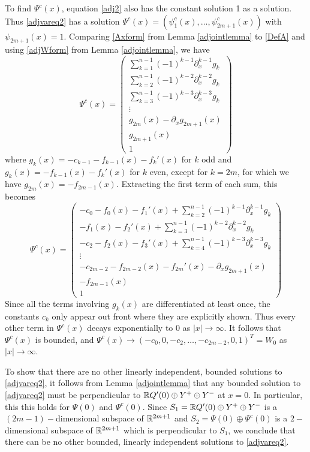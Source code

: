 \documentclass[thesis.tex]{subfiles}
\begin{document}
To find $\Psi^c(x)$, equation \eqref{adj2} also has the constant solution 1 as a solution. Thus \eqref{adjvareq2} has a solution $\Psi^c(x) = (\psi^c_1(x), \dots, \psi^c_{2m+1}(x))$ with $\psi_{2m+1}(x) = 1$. Comparing \eqref{Axform} from Lemma \ref{adjointlemma} to \eqref{DefA} and using \eqref{adjWform} from Lemma \ref{adjointlemma}, we have
\[
\Psi^c(x) 
= \begin{pmatrix}
\sum_{k=1}^{n-1} (-1)^{k-1} \partial_x^{k-1} g_k  \\
\sum_{k=2}^{n-1} (-1)^{k-2} \partial_x^{k-2} g_k  \\
\sum_{k=3}^{n-1} (-1)^{k-3} \partial_x^{k-3} g_k  \\ 
\vdots \\
g_{2m}(x) -\partial_x g_{2m+1}(x) \\
g_{2m+1}(x) \\
1
\end{pmatrix}
\]
where $g_k(x) = -c_{k-1} - f_{k-1}(x) - f_k'(x)$ for $k$ odd and $g_k(x) = -f_{k-1}(x) - f_k'(x)$ for $k$ even, except for $k = 2m$, for which we have $g_{2m}(x) = -f_{2m-1}(x)$. Extracting the first term of each sum, this becomes
\[
\Psi^c(x) 
= \begin{pmatrix}
-c_0 - f_0(x) - f_1'(x) + \sum_{k=2}^{n-1} (-1)^{k-1} \partial_x^{k-1} g_k  \\
- f_1(x) - f_2'(x) + \sum_{k=3}^{n-1} (-1)^{k-2} \partial_x^{k-2} g_k  \\
-c_2 - f_2(x) - f_3'(x) + \sum_{k=4}^{n-1} (-1)^{k-3} \partial_x^{k-3} g_k  \\ 
\vdots \\
-c_{2m-2} - f_{2m-2}(x) - f_{2m}'(x) -\partial_x g_{2m+1}(x) \\
-f_{2m-1}(x) \\
1
\end{pmatrix}
\]
Since all the terms involving $g_k(x)$ are differentiated at least once, the constants $c_k$ only appear out front where they are explicitly shown. Thus every other term in $\Psi^c(x)$ decays exponentially to 0 as $|x| \rightarrow \infty$. It follows that $\Psi^c(x)$ is bounded, and $\Psi^c(x) \rightarrow (-c_0, 0, -c_2, \dots, -c_{2m-2}, 0, 1)^T = W_0$ as $|x| \rightarrow \infty$.

To show that there are no other linearly independent, bounded solutions to \eqref{adjvareq2}, it follows from Lemma \ref{adjointlemma} that any bounded solution to \eqref{adjvareq2} must be perpendicular to ${\mathbb R} Q'(0) \oplus Y^+ \oplus Y^-$ at $x = 0$. In particular, this this holds for $\Psi(0)$ and $\Psi^c(0)$. Since $S_1 = {\mathbb R} Q'(0) \oplus Y^+ \oplus Y^-$ is a $(2m-1)-$dimensional subspace of ${\mathbb R}^{2m+1}$ and $S_2 = \Psi(0) \oplus \Psi^c(0)$ is a $2-$dimensional subspace of ${\mathbb R}^{2m+1}$ which is perpendicular to $S_1$, we conclude that there can be no other bounded, linearly independent solutions to \eqref{adjvareq2}.
\end{document}
